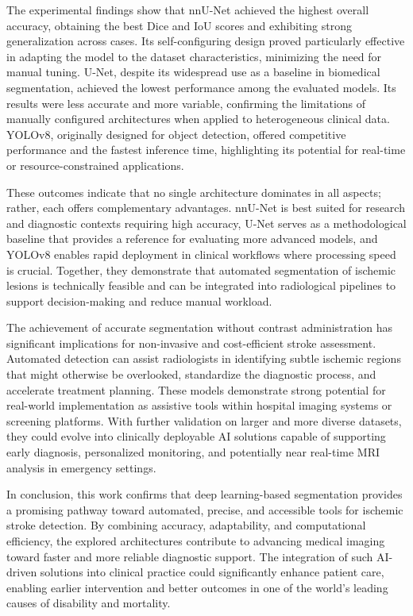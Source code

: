 \documentclass[12pt]{article}
\begin{document}
The experimental findings show that nnU-Net achieved the highest overall accuracy, obtaining the best Dice and IoU scores and exhibiting strong generalization across cases. Its self-configuring design proved particularly effective in adapting the model to the dataset characteristics, minimizing the need for manual tuning. U-Net, despite its widespread use as a baseline in biomedical segmentation, achieved the lowest performance among the evaluated models. Its results were less accurate and more variable, confirming the limitations of manually configured architectures when applied to heterogeneous clinical data. YOLOv8, originally designed for object detection, offered competitive performance and the fastest inference time, highlighting its potential for real-time or resource-constrained applications.

These outcomes indicate that no single architecture dominates in all aspects; rather, each offers complementary advantages. nnU-Net is best suited for research and diagnostic contexts requiring high accuracy, U-Net serves as a methodological baseline that provides a reference for evaluating more advanced models, and YOLOv8 enables rapid deployment in clinical workflows where processing speed is crucial. Together, they demonstrate that automated segmentation of ischemic lesions is technically feasible and can be integrated into radiological pipelines to support decision-making and reduce manual workload.

The achievement of accurate segmentation without contrast administration has significant implications for non-invasive and cost-efficient stroke assessment. Automated detection can assist radiologists in identifying subtle ischemic regions that might otherwise be overlooked, standardize the diagnostic process, and accelerate treatment planning. These models demonstrate strong potential for real-world implementation as assistive tools within hospital imaging systems or screening platforms. With further validation on larger and more diverse datasets, they could evolve into clinically deployable AI solutions capable of supporting early diagnosis, personalized monitoring, and potentially near real-time MRI analysis in emergency settings.

In conclusion, this work confirms that deep learning-based segmentation provides a promising pathway toward automated, precise, and accessible tools for ischemic stroke detection. By combining accuracy, adaptability, and computational efficiency, the explored architectures contribute to advancing medical imaging toward faster and more reliable diagnostic support. The integration of such AI-driven solutions into clinical practice could significantly enhance patient care, enabling earlier intervention and better outcomes in one of the world’s leading causes of disability and mortality.

\printbibliography[heading=bibintoc,title={References}]
\end{document}
